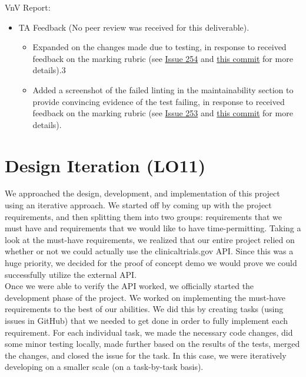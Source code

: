 \documentclass{article}
\begin{document}
VnV Report:
\begin{itemize}
	\item TA Feedback (No peer review was received for this deliverable).
	\begin{itemize}
		\item Expanded on the changes made due to testing, in response to received feedback on the marking rubric (see \href{https://github.com/davimang/REACH/issues/254}{Issue 254} and \href{https://github.com/davimang/REACH/commit/06620ec4af39e47e90e0647ae05cda2a58971ab7}{this commit} for more details).3
		\item Added a screenshot of the failed linting in the maintainability section to provide convincing evidence of the test failing, in response to received feedback on the marking rubric (see \href{https://github.com/davimang/REACH/issues/253}{Issue 253} and \href{https://github.com/davimang/REACH/commit/06620ec4af39e47e90e0647ae05cda2a58971ab7}{this commit} for more details).
	\end{itemize}
\end{itemize}


\section{Design Iteration (LO11)}


We approached the design, development, and implementation of this project using an iterative approach. 
We started off by coming up with the project requirements, and then splitting them into two groups: 
requirements that we must have and requirements that we would like to have time-permitting. Taking a 
look at the must-have requirements, we realized that our entire project relied on whether or not we 
could actually use the clinicaltrials.gov API. Since this was a huge priority, we decided for the proof 
of concept demo we would prove we could successfully utilize the external API.\\

Once we were able to verify the API worked, we officially started the development phase of the project. 
We worked on implementing the must-have requirements to the best of our abilities. We did this by creating 
tasks (using issues in GitHub) that we needed to get done in order to fully implement each requirement. 
For each individual task, we made the necessary code changes, did some minor testing locally, made further 
based on the results of the tests, merged the changes, and closed the issue for the task. In this case, we 
were iteratively developing on a smaller scale (on a task-by-task basis).\\
\end{document}
